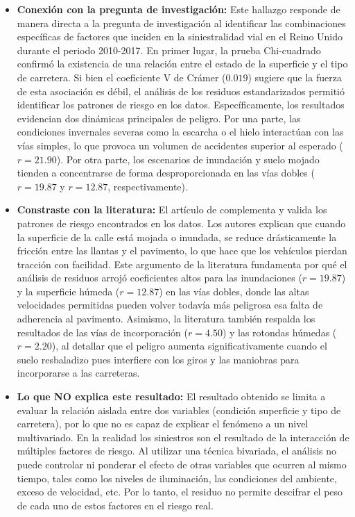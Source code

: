 \documentclass[12pt]{article}
\begin{document}
\begin{itemize}
    \item \textbf{Conexión con la pregunta de investigación:} Este hallazgo responde 
    de manera directa a la pregunta de investigación al identificar las combinaciones 
    específicas de factores que inciden en la siniestralidad vial en el Reino Unido 
    durante el periodo 2010-2017. En primer lugar, la prueba Chi-cuadrado confirmó 
    la existencia de una relación entre el estado de la superficie y el tipo de 
    carretera. Si bien el coeficiente V de Crámer ($0.019$) sugiere que la fuerza 
    de esta asociación es débil, el análisis de los residuos estandarizados permitió 
    identificar los patrones de riesgo en los datos.
Específicamente, los resultados evidencian dos dinámicas principales de peligro. 
Por una parte, las condiciones invernales severas como la escarcha o el hielo 
interactúan con las vías simples, lo que provoca un volumen de accidentes 
superior al esperado ($r = 21.90$). Por otra parte, los escenarios de inundación 
y suelo mojado tienden a concentrarse de forma desproporcionada en las vías dobles 
($r = 19.87$ y $r = 12.87$, respectivamente).

    
	\item \textbf{Constraste con la literatura:} El artículo de \textcite{KARZAN2017} 
	complementa y valida los patrones de riesgo encontrados en los datos. Los autores 
	explican que cuando la superficie de la calle está mojada o inundada, se reduce 
	drásticamente la fricción entre las llantas y el pavimento, lo que hace que los 
	vehículos pierdan tracción con facilidad. Este argumento de la literatura 
	fundamenta por qué el análisis de residuos arrojó coeficientes altos para las 
	inundaciones ($r = 19.87$) y la superficie húmeda ($r = 12.87$) en las vías dobles, 
	donde las altas velocidades permitidas pueden volver todavía más peligrosa esa falta 
	de adherencia al pavimento.
Asimismo, la literatura también respalda los resultados de las vías de incorporación 
($r = 4.50$) y las rotondas húmedas ($r = 2.20$), al detallar que el peligro aumenta 
significativamente cuando el suelo resbaladizo pues interfiere con los giros y las
maniobras para incorporarse a las carreteras. 

	
	\item \textbf{Lo que NO explica este resultado:} El resultado obtenido se limita 
	a evaluar la relación aislada entre dos variables (condición superficie y tipo de 
	carretera), por lo que no es capaz de explicar el fenómeno a un nivel multivariado.
	En la realidad los siniestros son el resultado de la interacción de múltiples 
	factores de riesgo. Al utilizar una técnica bivariada, el análisis no puede 
	controlar ni ponderar el efecto de otras variables que ocurren al mismo tiempo, 
	tales como los niveles de iluminación, las condiciones del ambiente, exceso de 
	velocidad, etc. Por lo tanto, el residuo no permite descifrar el peso de cada 
	uno de estos factores en el riesgo real.


\end{itemize}
\end{document}
